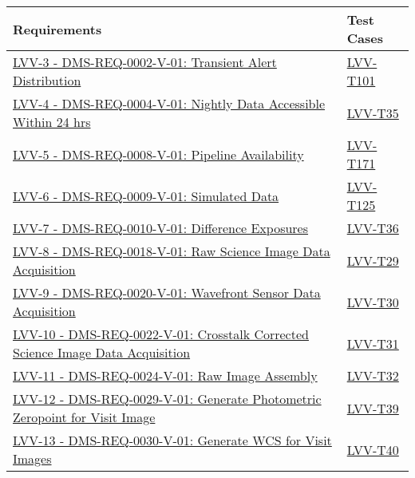 \begin{longtable}[]{p{13cm}p{3cm}}
\toprule
Requirements & Test Cases\tabularnewline
\midrule
\endhead
\href{https://jira.lsstcorp.org/browse/LVV-3}{LVV-3 - DMS-REQ-0002-V-01:
Transient Alert Distribution} &
\protect\hyperlink{lvv-t101---verify-implementation-of-transient-alert-distribution-dms-req-0002}{LVV-T101}\tabularnewline
\href{https://jira.lsstcorp.org/browse/LVV-4}{LVV-4 - DMS-REQ-0004-V-01:
Nightly Data Accessible Within 24 hrs} &
\protect\hyperlink{lvv-t35---verify-implementation-of-nightly-data-accessible-within-24-hrs-dms-req-0004}{LVV-T35}\tabularnewline
\href{https://jira.lsstcorp.org/browse/LVV-5}{LVV-5 - DMS-REQ-0008-V-01:
Pipeline Availability} &
\protect\hyperlink{lvv-t171---verify-implementation-of-pipeline-availability-dms-req-0008}{LVV-T171}\tabularnewline
\href{https://jira.lsstcorp.org/browse/LVV-6}{LVV-6 - DMS-REQ-0009-V-01:
Simulated Data} &
\protect\hyperlink{lvv-t125---verify-implementation-of-simulated-data-dms-req-0009}{LVV-T125}\tabularnewline
\href{https://jira.lsstcorp.org/browse/LVV-7}{LVV-7 - DMS-REQ-0010-V-01:
Difference Exposures} &
\protect\hyperlink{lvv-t36---verify-implementation-of-difference-exposures--dms-req-0010}{LVV-T36}\tabularnewline
\href{https://jira.lsstcorp.org/browse/LVV-8}{LVV-8 - DMS-REQ-0018-V-01:
Raw Science Image Data Acquisition} &
\protect\hyperlink{lvv-t29---verify-implementation-of-raw-science-image-data-acquisition-dms-req-0018}{LVV-T29}\tabularnewline
\href{https://jira.lsstcorp.org/browse/LVV-9}{LVV-9 - DMS-REQ-0020-V-01:
Wavefront Sensor Data Acquisition} &
\protect\hyperlink{lvv-t30---verify-implementation-of-wavefront-sensor-data-acquisition-dms-req-0020}{LVV-T30}\tabularnewline
\href{https://jira.lsstcorp.org/browse/LVV-10}{LVV-10 -
DMS-REQ-0022-V-01: Crosstalk Corrected Science Image Data Acquisition} &
\protect\hyperlink{lvv-t31---verify-implementation-of-crosstalk-corrected-science-image-data-acquisition-dms-req-0022}{LVV-T31}\tabularnewline
\href{https://jira.lsstcorp.org/browse/LVV-11}{LVV-11 -
DMS-REQ-0024-V-01: Raw Image Assembly} &
\protect\hyperlink{lvv-t32---verify-implementation-of-raw-image-assembly-dms-req-0024}{LVV-T32}\tabularnewline
\href{https://jira.lsstcorp.org/browse/LVV-12}{LVV-12 -
DMS-REQ-0029-V-01: Generate Photometric Zeropoint for Visit Image} &
\protect\hyperlink{lvv-t39---verify-implementation-of-generate-photometric-zeropoint-for-visit-image-dms-req-0029}{LVV-T39}\tabularnewline
\href{https://jira.lsstcorp.org/browse/LVV-13}{LVV-13 -
DMS-REQ-0030-V-01: Generate WCS for Visit Images} &
\protect\hyperlink{lvv-t40---verify-implementation-of-generate-wcs-for-visit-images-dms-req-0030}{LVV-T40}\tabularnewline

\end{longtable}
